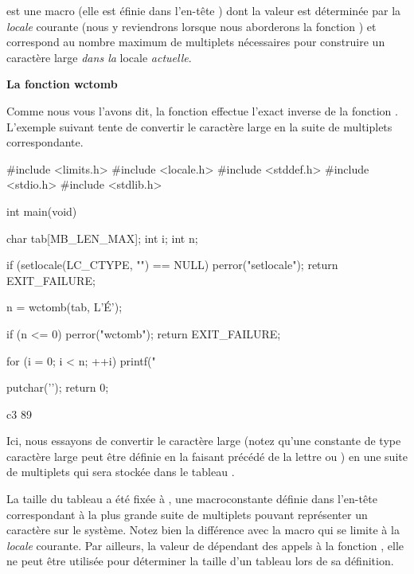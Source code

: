  est une macro (elle est éfinie dans l'en-tête
) dont la valeur est
déterminée par la \emph{locale} courante (nous y reviendrons lorsque
nous aborderons la fonction ) et correspond au
nombre maximum de multiplets nécessaires pour construire un caractère
large \emph{dans la} locale \emph{actuelle}.

\textbf{La fonction wctomb}
\label{la-fonction-wctomb}

Comme nous vous l'avons dit, la fonction  effectue
l'exact inverse de la fonction . L'exemple suivant
tente de convertir le caractère large  en la suite de
multiplets correspondante.

\begin{C}
#include <limits.h>
#include <locale.h>
#include <stddef.h>
#include <stdio.h>
#include <stdlib.h>


int main(void)
{
    char tab[MB_LEN_MAX];
    int i;
    int n;

    if (setlocale(LC_CTYPE, "") == NULL)
    {
        perror("setlocale");
        return EXIT_FAILURE;
    }

    n = wctomb(tab, L'É');

    if (n <= 0)
    {
        perror("wctomb");
        return EXIT_FAILURE;
    }

    for (i = 0; i < n; ++i)
        printf("%

    putchar('\n');
    return 0;
}
\end{C}

\begin{C}
c3 89
\end{C}

Ici, nous essayons de convertir le caractère large  (notez
qu'une constante de type caractère large peut être définie en la faisant
précédé de la lettre  ou ) en une suite de
multiplets qui sera stockée dans le tableau .

La taille du tableau  a été fixée à ,
une macroconstante définie dans l'en-tête
 correspondant à la plus
grande suite de multiplets pouvant représenter un caractère sur le
système. Notez bien la différence avec la macro 
qui se limite à la \emph{locale} courante. Par ailleurs, la valeur de
 dépendant des appels à la fonction
, elle ne peut être utilisée pour déterminer la
taille d'un tableau lors de sa définition.

